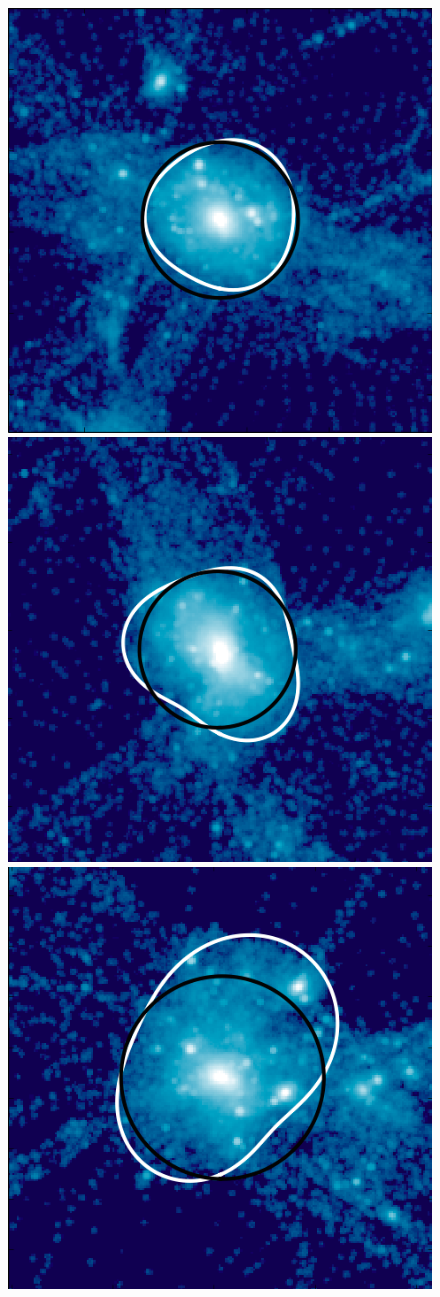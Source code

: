 \documentclass[numberedappendix,apj]{emulateapj}
\begin{document}
\begin{figure}
   \vspace{0.5cm}
   \includegraphics[width=0.7\columnwidth]{example_halos/pass_ex3.png}
   \hspace{0.4cm}
   \includegraphics[width=0.7\columnwidth]{example_halos/pass_ex4.png}\\
   \vspace{0.5cm}
   \includegraphics[width=0.7\columnwidth]{example_halos/pass_ex5.png}

\end{figure}
\end{document}
